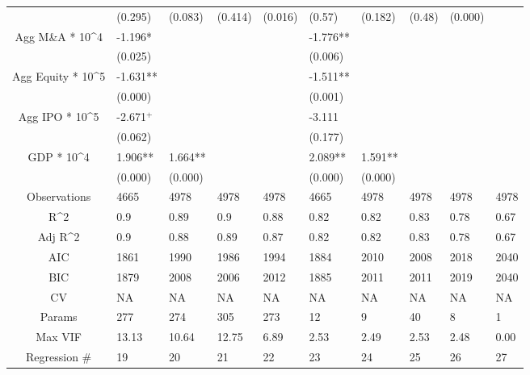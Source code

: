 \documentclass{article}
\begin{document}
\begin{table}[H]
\begin{tabular}{|clllllllll|}
   & (0.295) & (0.083) & (0.414) & (0.016) & (0.57) & (0.182) & (0.48) & (0.000) &  \\
  Agg M\&A * 10^4 & -1.196* &  &  &  & -1.776** &  &  &  &  \\
   & (0.025) &  &  &  & (0.006) &  &  &  &  \\
  Agg Equity * 10^5 & -1.631** &  &  &  & -1.511** &  &  &  &  \\
   & (0.000) &  &  &  & (0.001) &  &  &  &  \\
  Agg IPO * 10^5 & -2.671$^{+}$ &  &  &  & -3.111 &  &  &  &  \\
   & (0.062) &  &  &  & (0.177) &  &  &  &  \\
  GDP * 10^4 & 1.906** & 1.664** &  &  & 2.089** & 1.591** &  &  &  \\
   & (0.000) & (0.000) &  &  & (0.000) & (0.000) &  &  &  \\
  \hline
 Observations & 4665 & 4978 & 4978 & 4978 & 4665 & 4978 & 4978 & 4978 & 4978 \\
  R^2 & 0.9 & 0.89 & 0.9 & 0.88 & 0.82 & 0.82 & 0.83 & 0.78 & 0.67 \\
  Adj R^2 & 0.9 & 0.88 & 0.89 & 0.87 & 0.82 & 0.82 & 0.83 & 0.78 & 0.67 \\
  AIC & 1861 & 1990 & 1986 & 1994 & 1884 & 2010 & 2008 & 2018 & 2040 \\
  BIC & 1879 & 2008 & 2006 & 2012 & 1885 & 2011 & 2011 & 2019 & 2040 \\
  CV & NA & NA & NA & NA & NA & NA & NA & NA & NA \\
  Params & 277 & 274 & 305 & 273 & 12 & 9 & 40 & 8 & 1 \\
  Max VIF & 13.13 & 10.64 & 12.75 & 6.89 & 2.53 & 2.49 & 2.53 & 2.48 & 0.00 \\
  Regression \# & 19 & 20 & 21 & 22 & 23 & 24 & 25 & 26 & 27 \\
   \hline
\end{tabular}

\end{table}
\end{document}
